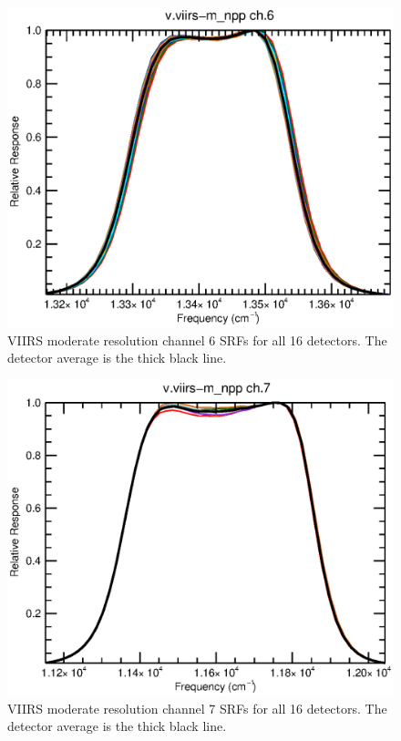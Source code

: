 \begin{figure}[H]
  \centering
  \includegraphics[bb= 0 15 400 330,clip,scale=0.8]{graphics/srfs/v.viirs-m_npp-06.eps}
  \caption{VIIRS moderate resolution channel 6 SRFs for all 16 detectors. The detector average is the thick black line.}
  \label{fig:v.viirs-m_npp-06}
\end{figure}
\begin{figure}[H]
  \centering
  \includegraphics[bb= 0 15 400 330,clip,scale=0.8]{graphics/srfs/v.viirs-m_npp-07.eps}
  \caption{VIIRS moderate resolution channel 7 SRFs for all 16 detectors. The detector average is the thick black line.}
  \label{fig:v.viirs-m_npp-07}
\end{figure}
